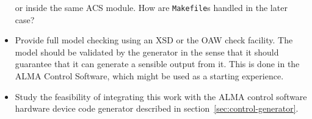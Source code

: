 \begin{itemize}
   or inside the same ACS module. How are \lstinline[language=sh]!Makefile!s handled in the later case?
   \item Provide full model checking using an XSD or the OAW check facility.
   The model should be validated by the generator in the sense
   that it should guarantee that it can generate a sensible
   output from it. This is done in the ALMA Control Software,
   which might be used as a starting experience.
    \item Study the feasibility of integrating this work with the
    ALMA control software hardware device code generator
    described in section~\ref{sec:control-generator}.
\end{itemize}

